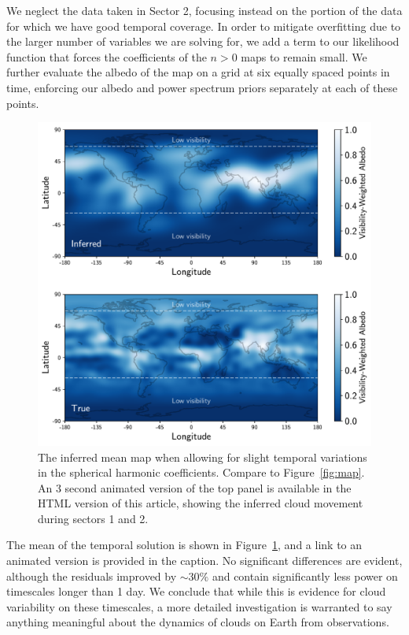 \documentclass[modern]{aastex62}
\begin{document}
We neglect the data taken in Sector 2, focusing instead on the portion of the data for which
we have good temporal coverage. In order to mitigate overfitting due to
the larger number of variables we are solving for,
we add a term to our likelihood function that forces the coefficients
of the $n > 0$ maps to remain small. We further evaluate the albedo of the map
on a grid at six equally spaced points in time, enforcing our albedo and
power spectrum priors separately at each of these points.

\begin{figure}[p!]
    \begin{centering}
    \includegraphics[width=\linewidth]{figures/map_temporal.pdf}
    \caption{\label{fig:map_temporal}
             The inferred mean map when allowing for slight temporal
             variations in the spherical harmonic coefficients. Compare
             to Figure~\ref{fig:map}. An 3 second animated version of the 
             top panel is available in the HTML version of this article, showing
             the inferred cloud movement during sectors 1 and 2.
             }
    \end{centering}
\end{figure}

The mean of the temporal solution is shown in Figure~\ref{fig:map_temporal},
and a link to an animated version is provided in the caption. No significant
differences are evident, although the residuals improved by ${\sim}30\%$
and contain significantly less power on timescales longer than 1 day.
We conclude that while this is evidence for cloud variability on these
timescales, a more detailed investigation is warranted to say anything
meaningful about the dynamics of clouds on Earth from \TESS observations.
\end{document}

